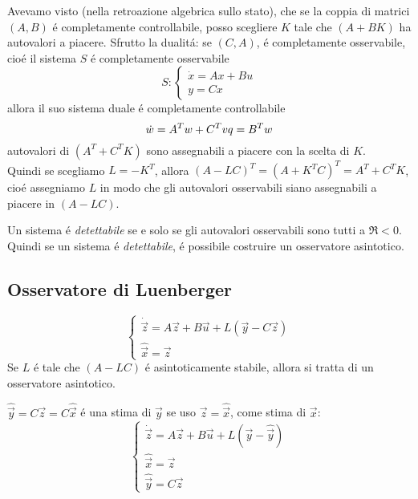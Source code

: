 \documentclass[../main.tex]{subfiles}
\begin{document}
		Avevamo visto (nella retroazione algebrica sullo stato), che se la coppia di matrici $ (A,B) $ \'e completamente controllabile, posso scegliere $ K $ tale che $ (A+BK) $ ha autovalori a piacere. Sfrutto la dualit\'a: se $ (C,A) $, \'e completamente osservabile, cio\'e il sistema $ S $ \'e completamente osservabile
		\[
			S:
			\begin{cases}
				\dot x = Ax + Bu\\
				y = Cx
			\end{cases}
		\]
		allora il suo sistema duale \'e completamente controllabile
		\[
			\dot w = A^T w + C^T v\\
			q = B^T w
		\]
		autovalori di $ (A^T + C^T K) $ sono assegnabili a piacere con la scelta di $ K $.\\
		Quindi se scegliamo $ L = -K^T $, allora $ (A-LC)^T = (A+K^TC)^T = A^T + C^TK $, cio\'e assegniamo $ L $ in modo che gli autovalori osservabili siano assegnabili a piacere in $ (A-LC) $.
		
		\begin{definition}
			Un sistema \'e \textit{detettabile} se e solo se gli autovalori osservabili sono tutti a $ \Re < 0 $. Quindi se un sistema \'e \textit{detettabile}, \'e possibile costruire un osservatore asintotico.
		\end{definition}
		
	\subsection{Osservatore di Luenberger}
		\[
			\begin{cases}
				\dot{\vec z} = A \vec z + B \vec u + L (\vec y - C \vec z)\\
				\hat{\vec x} = \vec z
			\end{cases}
		\]
		Se $ L $ \'e tale che $ (A-LC) $ \'e asintoticamente stabile, allora si tratta di un osservatore asintotico.
		
		$ \hat{\vec y} = C \vec z = C \hat{\vec x} $ \'e una stima di $ \vec y $ se uso $ \vec z = \hat{\vec x} $, come stima di $ \vec x $:
		\[
			\begin{cases}
				\dot{\vec z} = A \vec z + B \vec u + L (\vec y - \hat{\vec y})\\
				\hat{\vec x} = \vec z\\
				\hat{\vec y} = C \vec z
			\end{cases}
		\]
		
\end{document}
